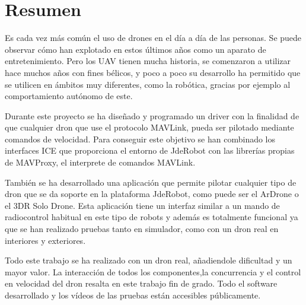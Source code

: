 \chapter*{Resumen}

\hspace{1cm} Es cada vez más común el uso de drones en el día a día de las personas. Se puede observar cómo han explotado en estos últimos años como un aparato de entretenimiento. Pero los UAV tienen mucha historia, se comenzaron a utilizar hace muchos años con fines bélicos, y poco a poco su desarrollo ha permitido que se utilicen en ámbitos muy diferentes, como la robótica, gracias por ejemplo al comportamiento autónomo de este.

\hspace{1cm} Durante este proyecto se ha diseñado y programado un driver con la finalidad de que cualquier dron que use el protocolo MAVLink, pueda ser pilotado mediante comandos de velocidad. Para conseguir este objetivo se han combinado los interfaces ICE que proporciona el entorno de JdeRobot con las librerías propias de MAVProxy, el interprete de comandos MAVLink. 


\hspace{1cm} También se ha desarrollado una aplicación que permite pilotar cualquier tipo de dron que se da soporte en la plataforma JdeRobot, como puede ser el ArDrone o el 3DR Solo Drone. Esta aplicación tiene un interfaz similar a un mando de radiocontrol habitual en este tipo de robots y además es totalmente funcional ya que se han realizado pruebas tanto en simulador, como con un dron real en interiores y exteriores.

\hspace{1cm} Todo este trabajo se ha realizado con un dron real, añadiendole dificultad y un mayor valor. La interacción de todos los componentes,la concurrencia y el control en velocidad del dron resalta en este trabajo fin de grado. Todo el software desarrollado y los vídeos de las pruebas están accesibles p\'ublicamente. 

